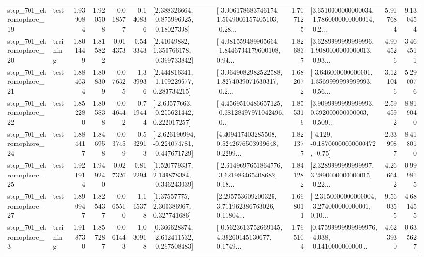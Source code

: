 \begin{tabular}{llrrrrllrlrr}
  step\_701\_chromophore\_19 &      test &      1.939084 &    1.920508 &     -0.018577 & -0.140836 &    [2.388326664, -0.875996925, -0.18027398] &  [-3.906178683746174, 1.5049006157405103, -0.28... &       1.707125 &  [3.6510000000000034, -1.7860000000000014, -0.2... &            5.917684 &          9.130454 \\
  step\_701\_chromophore\_20 &  training &      1.801449 &    1.815822 &      0.014373 &  0.543343 &     [2.41049882, 1.350766178, -0.399733842] &  [-4.081559489905664, -1.8446734179600108, 0.94... &       1.826837 &  [3.6289999999999996, 1.9080000000000013, -0.93... &            4.904526 &          3.464511 \\
  step\_701\_chromophore\_21 &      test &      1.884634 &    1.808309 &     -0.076325 & -1.339936 &    [2.444816341, -1.109229677, 0.283734215] &  [-3.9649082982522588, 1.8274039071630317, -0.2... &       1.682072 &  [-3.646000000000001, 1.8569999999999993, -0.56... &            3.121046 &          5.290076 \\
  step\_701\_chromophore\_22 &      test &      1.852280 &    1.805838 &     -0.046442 & -0.719444 &    [-2.63577663, -0.255621442, 0.222017257] &  [-4.4569510486657125, -0.38128497971042496, -0... &       1.855319 &  [3.9099999999999993, 0.392000000000003, -0.509... &            2.594592 &          8.819040 \\
  step\_701\_chromophore\_24 &      test &      1.884417 &    1.846958 &     -0.037459 & -0.532913 &  [-2.626190994, -0.224074781, -0.447671729] &  [4.409417403285508, 0.5242676503939648, 0.2299... &       1.821377 &              [-4.129, -0.18700000000000472, -0.75] &            2.339987 &          8.418010 \\
  step\_701\_chromophore\_25 &      test &      1.921914 &    1.949240 &      0.027326 &  0.812294 &    [1.520779337, 2.149878384, -0.346243039] &  [-2.6149697651864776, -3.621986465408682, 0.18... &       1.841282 &  [2.3289999999999997, 3.2890000000000015, -0.22... &            4.266642 &          0.999815 \\
  step\_701\_chromophore\_27 &      test &      1.890947 &    1.825437 &     -0.065510 & -1.115378 &      [1.37557775, 2.300386967, 0.327741686] &  [2.295753609200326, 3.711962386763026, 0.11804... &       1.698011 &  [-2.3150000000000004, -3.274000000000001, 0.10... &            9.560355 &          4.681455 \\
   step\_701\_chromophore\_3 &  training &      1.918730 &    1.857287 &     -0.061443 & -1.030918 &   [0.366628874, -2.612411532, -0.297508483] &  [-0.5623613752669145, 4.39260145130677, 0.1749... &       1.795104 &  [0.47599999999999976, -4.038, -0.1410000000000... &            4.623930 &          0.635627 \\

\end{tabular}
